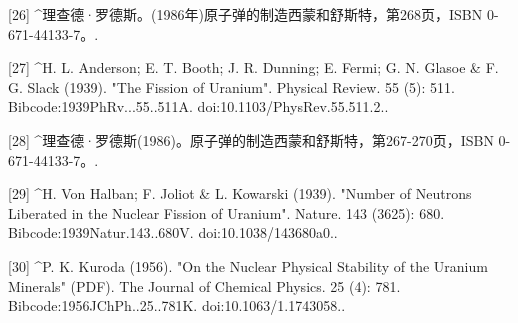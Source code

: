 [26]
^理查德·罗德斯。(1986年)原子弹的制造西蒙和舒斯特，第268页，ISBN 0-671-44133-7。.

[27]
^H. L. Anderson; E. T. Booth; J. R. Dunning; E. Fermi; G. N. Glasoe & F. G. Slack (1939). "The Fission of Uranium". Physical Review. 55 (5): 511. Bibcode:1939PhRv...55..511A. doi:10.1103/PhysRev.55.511.2..

[28]
^理查德·罗德斯(1986)。原子弹的制造西蒙和舒斯特，第267-270页，ISBN 0-671-44133-7。.

[29]
^H. Von Halban; F. Joliot & L. Kowarski (1939). "Number of Neutrons Liberated in the Nuclear Fission of Uranium". Nature. 143 (3625): 680. Bibcode:1939Natur.143..680V. doi:10.1038/143680a0..

[30]
^P. K. Kuroda (1956). "On the Nuclear Physical Stability of the Uranium Minerals" (PDF). The Journal of Chemical Physics. 25 (4): 781. Bibcode:1956JChPh..25..781K. doi:10.1063/1.1743058..